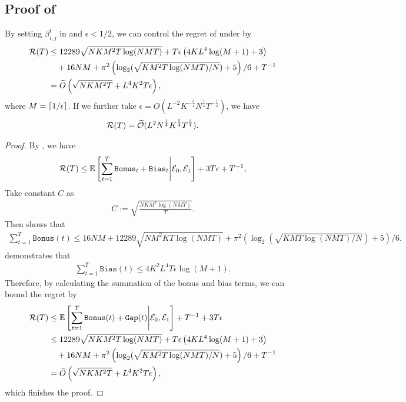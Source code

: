 \subsection{Proof of }
\begin{theorem}\label{thm:main-formal}
By setting $\beta_{i,j}^t$ in  and $\epsilon < 1/2$, we can control the regret of  under  by 
\begin{align*}
    {\mathcal{R}}(T) &\le  12289 \sqrt{NKM^2T\log(NMT)} +  T\epsilon\left(4KL^4\log(M+1) + 3\right)\\
    &\quad + 16 NM +  \pi^2\left(\log_2(\sqrt{KM^2T\log(NMT)/N}) + 5\right)/6 +  T^{-1} \\
    &= \widetilde{O}\left(\sqrt{NKM^2T} + L^4K^2T\epsilon\right),
\end{align*}
where $M = \lceil 1/\epsilon \rceil$. If we further take $\epsilon = O\left(L^{-2}K^{-\frac{3}{4}}N^{\frac
{1}{4}}T^{-\frac{1}{4}}\right)$, we have
\begin{align*}
    {\mathcal{R}}(T) = \widetilde{{\mathcal{O}}}(L^{2}N^{\frac{1}{4}}K^{\frac{5}{4}}T^{\frac{3}{4}}).
\end{align*}
\begin{proof}
By , we have
\begin{align*}
    {\mathcal{R}}(T) \le \mathbb{E}\left[\sum_{t=1}^T \texttt{Bonus}_t + \texttt{Bias}_t\middle| {\mathcal{E}}_0, {\mathcal{E}}_1\right] + 3T\epsilon + T^{-1},
\end{align*}
Take constant $C$ as
\begin{align}\label{eq:def-C}
    C:= \sqrt{\frac{NKM^2\log(NMT)}{T}}.
\end{align}
Then  shows that
\begin{align*}
    \sum_{t=1}^T \texttt{Bonus}(t) \le 16NM + 12289\sqrt{NM^2KT\log(NMT)} + \pi^2\left(\log_2(\sqrt{KMT\log(NMT)/N}) + 5\right)/6.
\end{align*}
 demonstrates that
\begin{align*}
    \sum_{t=1}^T \texttt{Bias}(t) \le 4K^2L^4 T\epsilon \log(M + 1).
\end{align*}
Therefore, by calculating the summation of the bonus and bias terms, we can bound the regret by
\begin{align*}
    {\mathcal{R}}(T) &\le \mathbb{E}\left[\sum_{t=1}^T \texttt{Bonus}(t) + \texttt{Gap}(t) \middle| {\mathcal{E}}_0, {\mathcal{E}}_1\right] +  T^{-1} + 3T\epsilon \\
    &\le  12289 \sqrt{NKM^2T\log(NMT)} +  T\epsilon\left(4KL^4\log(M+1) + 3\right)\\
    &\quad + 16 NM +  \pi^2\left(\log_2(\sqrt{KM^2T\log(NMT)/N}) + 5\right)/6 +  T^{-1} \\
    &= \widetilde{O}\left(\sqrt{NKM^2T} + L^4K^2T\epsilon\right),
\end{align*}
which finishes the proof.
\end{proof}
\end{theorem}

